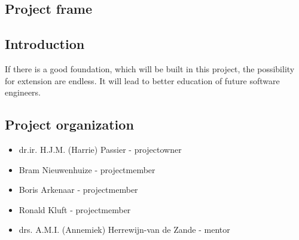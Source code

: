 \documentclass{article}
\begin{document}
\begin{itemize}
\section{Project frame}

\subsection{Introduction}

If there is a good foundation, which will be built in this project, the possibility for extension are endless. It will lead to better education of future software engineers.  

\subsection{Project organization}

\begin{itemize}
  \item dr.ir. H.J.M. (Harrie) Passier - projectowner
  \item Bram Nieuwenhuize - projectmember
  \item Boris Arkenaar - projectmember
  \item Ronald Kluft - projectmember
  \item drs. A.M.I. (Annemiek) Herrewijn-van de Zande - mentor
\end{itemize}


\end{itemize}
\end{document}
